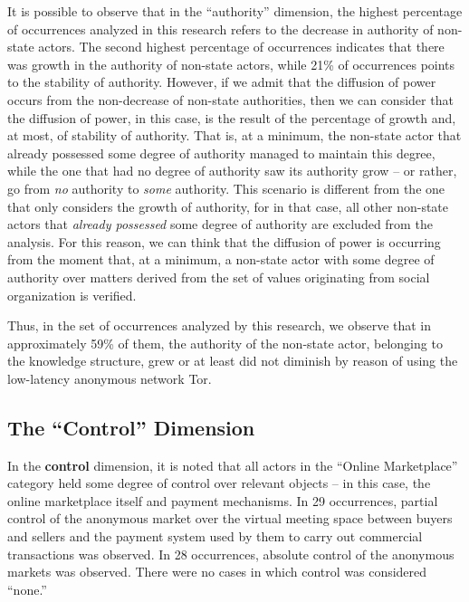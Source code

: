It is possible to observe that in the ``authority'' dimension, the highest percentage of occurrences analyzed in this research refers to the decrease in authority of non-state actors. The second highest percentage of occurrences indicates that there was growth in the authority of non-state actors, while 21\% of occurrences points to the stability of authority. However, if we admit that the diffusion of power occurs from the non-decrease of non-state authorities, then we can consider that the diffusion of power, in this case, is the result of the percentage of growth and, at most, of stability of authority. That is, at a minimum, the non-state actor that already possessed some degree of authority managed to maintain this degree, while the one that had no degree of authority saw its authority grow -- or rather, go from \textit{no} authority to \textit{some} authority. This scenario is different from the one that only considers the growth of authority, for in that case, all other non-state actors that \textit{already possessed} some degree of authority are excluded from the analysis. For this reason, we can think that the diffusion of power is occurring from the moment that, at a minimum, a non-state actor with some degree of authority over matters derived from the set of values originating from social organization is verified.

Thus, in the set of occurrences analyzed by this research, we observe that in approximately 59\% of them, the authority of the non-state actor, belonging to the knowledge structure, grew or at least did not diminish by reason of using the low-latency anonymous network Tor.

\subsection{The ``Control'' Dimension}

In the \textbf{control} dimension, it is noted that all actors in the ``Online Marketplace'' category held some degree of control over relevant objects -- in this case, the online marketplace itself and payment mechanisms. In 29 occurrences, partial control of the anonymous market over the virtual meeting space between buyers and sellers and the payment system used by them to carry out commercial transactions was observed. In 28 occurrences, absolute control of the anonymous markets was observed. There were no cases in which control was considered ``none.''

